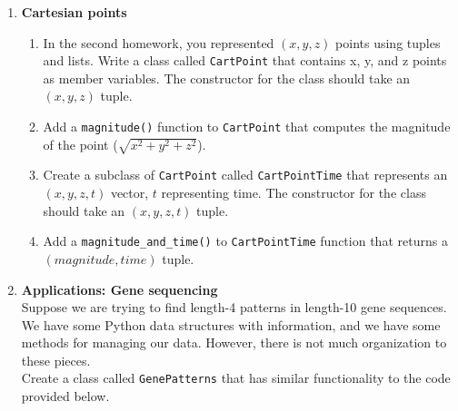 \documentclass{article}
\newcounter{points}
\newcommand\printpoints{Total number of points: \thepoints}
\begin{document}
\begin{enumerate}
\item \textbf{Cartesian points}
\begin{enumerate}
\item In the second homework, you represented $(x, y, z)$ points using tuples and lists.  Write a class called \texttt{CartPoint} that contains x, y, and z points as member variables.  The constructor for the class should take an $(x, y, z)$ tuple.
\end{enumerate}

\begin{enumerate}
\setcounter{enumii}{1}
\item Add a \texttt{magnitude()} function to \texttt{CartPoint} that computes the magnitude of the point ($\sqrt{x^2 + y^2 + z^2}$).
\end{enumerate}

\begin{enumerate}
\setcounter{enumii}{2}
\item Create a subclass of \texttt{CartPoint} called \texttt{CartPointTime} that represents an $(x, y, z, t)$ vector, $t$ representing time.  The constructor for the class should take an $(x, y, z, t)$ tuple.
\end{enumerate}

\begin{enumerate}
\setcounter{enumii}{3}
\item Add a \texttt{magnitude\_and\_time()} to \texttt{CartPointTime} function that returns a $(magnitude, time)$ tuple.
\end{enumerate}

\newpage
\item \textbf{Applications: Gene sequencing} \\
Suppose we are trying to find length-4 patterns in length-10 gene sequences.  We have some Python data structures with information, and we have some methods for managing our data.  However, there is not much organization to these pieces. \\

Create a class called \texttt{GenePatterns} that has similar functionality to the code provided below. \\





\end{enumerate}
\end{document}

